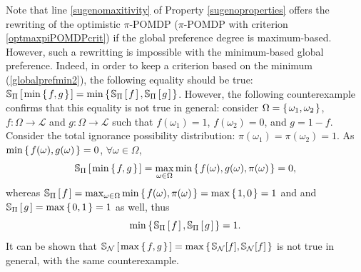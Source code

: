 Note that line \ref{sugenomaxitivity} of Property \ref{sugenoproperties} 
offers the rewriting of the optimistic $\pi$-POMDP 
($\pi$-POMDP with criterion \ref{optmaxpiPOMDPcrit})
if the global preference degree is maximum-based.
However, such a rewritting is impossible with the minimum-based global preference.
Indeed, in order to keep a criterion based on the minimum (\ref{globalprefmin2}), 
the following equality should be true: $ \mathbb{S}_{\Pi} \left[ \left.  \min \left\{ \left.  f, g \right. \right\}  \right. \right] = \min \left\{ \left.  \mathbb{S}_{\Pi} \left[ \left. f \right. \right], \mathbb{S}_{\Pi} \left[ \left. g \right. \right]  \right. \right\} $.
However, the following counterexample confirms that this equality is not true in general:
consider $\Omega = \left\{ \left.  \omega_1, \omega_2  \right. \right\}$, $f:\Omega \rightarrow \mathcal{L}$ and $g:\Omega \rightarrow \mathcal{L}$ such that $f(\omega_1) = 1$, $f(\omega_2) = 0$,
and $g = 1 - f$. Consider the total ignorance possibility distribution: $\pi(\omega_1) = \pi(\omega_2) = 1$. As $\min \left\{ \left.  f(\omega), g(\omega)  \right. \right\} = 0$, $\forall \omega \in \Omega$,
\[ \mathbb{S}_{\Pi} \left[ \left.  \min\left\{ \left.  f,g  \right. \right\}  \right. \right] = \max_{\omega \in \Omega} \min \left\{ \left.  f(\omega), g(\omega), \pi(\omega)  \right. \right\} = 0, \] 
whereas $\mathbb{S}_{\Pi} \left[ \left.  f  \right. \right] = \max_{\omega \in \Omega} \min \left\{ \left.  f(\omega), \pi(\omega)  \right. \right\} = \max \left\{ \left.  1,0  \right. \right\} = 1$ and
and $\mathbb{S}_{\Pi} \left[ \left.  g  \right. \right] = \max \left\{ \left.  0,1  \right. \right\} = 1$ as well, thus 
\[\min \left\{ \left. \mathbb{S}_{\Pi} \left[ \left.  f  \right. \right], \mathbb{S}_{\Pi} \left[ \left.  g  \right. \right]  \right. \right\} = 1. \] 
It can be shown that $\mathbb{S}_{\mathcal{N}} \left[ \left.  \max \left\{ \left. f,g \right. \right\}  \right. \right] = \max \left\{ \left.  \mathbb{S}_{\mathcal{N}}[f], \mathbb{S}_{\mathcal{N}}[f] \right. \right\}$
is not true in general, with the same counterexample.


